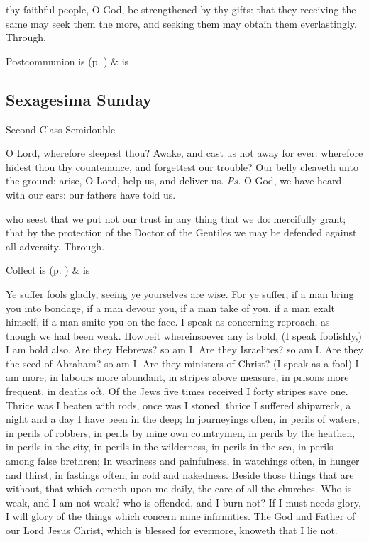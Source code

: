 \postcommunion
{} thy faithful people, O God, be strengthened by thy gifts: that they receiving the same may seek them the more, and seeking them may obtain them everlastingly. Through.
\begin{rubric}
     Postcommunion is  (p. \pageref{SPSaints}) \&  is 
\end{rubric}


\subsection{Sexagesima Sunday}
\begin{inhead}
{Second Class Semidouble}
\end{inhead}


\introit
{} O Lord, wherefore sleepest thou? Awake, and cast us not away for ever: wherefore hidest thou thy countenance, and forgettest our trouble? Our belly cleaveth unto the ground: arise, O Lord, help us, and deliver us. \textit{Ps.} O God, we have heard with our ears: our fathers have told us.

\collect
{} who seest that we put not our trust in any thing that we do: mercifully grant; that by the protection of the Doctor of the Gentiles we may be defended against all adversity. Through.

\begin{rubric}
     Collect is  (p. \pageref{SPSaints}) \&  is 
\end{rubric}

 Ye suffer fools gladly, seeing ye yourselves are wise. For ye suffer, if a man bring you into bondage, if a man devour you, if a man take of you, if a man exalt himself, if a man smite you on the face. I speak as concerning reproach, as though we had been weak. Howbeit whereinsoever any is bold, (I speak foolishly,) I am bold also. Are they Hebrews? so am I. Are they Israelites? so am I. Are they the seed of Abraham? so am I. Are they ministers of Christ? (I speak as a fool) I am more; in labours more abundant, in stripes above measure, in prisons more frequent, in deaths oft. Of the Jews five times received I forty stripes save one. Thrice was I beaten with rods, once was I stoned, thrice I suffered shipwreck, a night and a day I have been in the deep; In journeyings often, in perils of waters, in perils of robbers, in perils by mine own countrymen, in perils by the heathen, in perils in the city, in perils in the wilderness, in perils in the sea, in perils among false brethren; In weariness and painfulness, in watchings often, in hunger and thirst, in fastings often, in cold and nakedness. Beside those things that are without, that which cometh upon me daily, the care of all the churches. Who is weak, and I am not weak? who is offended, and I burn not? If I must needs glory, I will glory of the things which concern mine infirmities. The God and Father of our Lord Jesus Christ, which is blessed for evermore, knoweth that I lie not.

